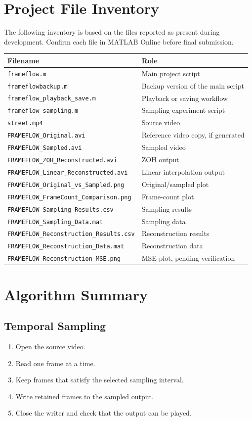 \documentclass[12pt,a4paper,oneside]{report}
\begin{document}
\chapter{Project File Inventory}
The following inventory is based on the files reported as present during development. Confirm each file in MATLAB Online before final submission.
\begin{longtable}{p{}p{}}
\toprule
\textbf{Filename} & \textbf{Role}\\
\midrule
\texttt{frameflow.m} & Main project script\\
\texttt{frameflowbackup.m} & Backup version of the main script\\
\texttt{frameflow\_playback\_save.m} & Playback or saving workflow\\
\texttt{frameflow\_sampling.m} & Sampling experiment script\\
\texttt{street.mp4} & Source video\\
\texttt{FRAMEFLOW\_Original.avi} & Reference video copy, if generated\\
\texttt{FRAMEFLOW\_Sampled.avi} & Sampled video\\
\texttt{FRAMEFLOW\_ZOH\_Reconstructed.avi} & ZOH output\\
\texttt{FRAMEFLOW\_Linear\_Reconstructed.avi} & Linear interpolation output\\
\texttt{FRAMEFLOW\_Original\_vs\_Sampled.png} & Original/sampled plot\\
\texttt{FRAMEFLOW\_FrameCount\_Comparison.png} & Frame-count plot\\
\texttt{FRAMEFLOW\_Sampling\_Results.csv} & Sampling results\\
\texttt{FRAMEFLOW\_Sampling\_Data.mat} & Sampling data\\
\texttt{FRAMEFLOW\_Reconstruction\_Results.csv} & Reconstruction results\\
\texttt{FRAMEFLOW\_Reconstruction\_Data.mat} & Reconstruction data\\
\texttt{FRAMEFLOW\_Reconstruction\_MSE.png} & MSE plot, pending verification\\
\bottomrule
\end{longtable}

\chapter{Algorithm Summary}
\section*{Temporal Sampling}
\begin{enumerate}[leftmargin=*]
\item Open the source video.
\item Read one frame at a time.
\item Keep frames that satisfy the selected sampling interval.
\item Write retained frames to the sampled output.
\item Close the writer and check that the output can be played.
\end{enumerate}
\end{document}
